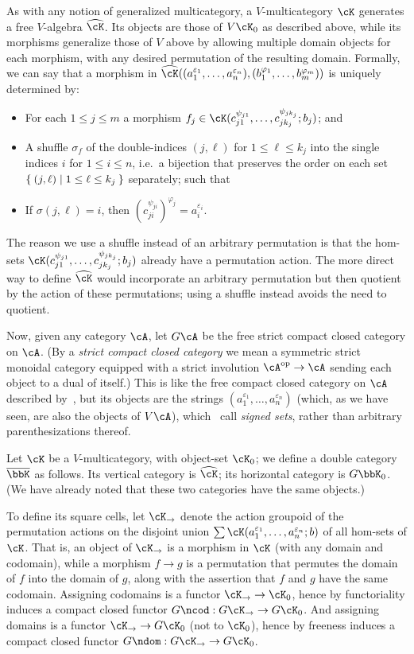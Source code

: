 \documentclass{amsart}
\newcommand{\A}{\cA}
\renewcommand{\Khat}{\ensuremath{\widehat{\cK}}\xspace}
\renewcommand{\Kbar}{\ensuremath{\overline{\bbK}}\xspace}
\newcommand{\K}{\bbK}
\newcommand{\e}[1][]{^{\varepsilon_{#1}}}
\renewcommand{\ph}[1][]{^{\varphi_{#1}}}
\newcommand{\ps}[1][]{^{\psi_{#1}}}
\begin{document}
As with any notion of generalized multicategory, a $V$-multicategory $\cK$ generates a free $V$-algebra $\Khat$.
Its objects are those of $V\cK_0$ as described above, while its morphisms generalize those of $V$ above by allowing multiple domain objects for each morphism, with any desired permutation of the resulting domain.
Formally, we can say that a morphism in $\Khat((a_1\e[1],\dots,a_n\e[n]),(b_1\ph[1],\dots,b_m\ph[m]))$ is uniquely determined by:
\begin{itemize}
\item For each $1\le j\le m$ a morphism $f_j\in \cK(c_{j1}\ps[j1],\dots,c_{j k_j}\ps[j k_j];b_j)$; and
\item A shuffle $\sigma_f$ of the double-indices $(j,\ell)$ for $1\le \ell\le k_j$ into the single indices $i$ for $1\le i\le n$, i.e.\ a bijection that preserves the order on each set $\Set{ (j,\ell) | 1\le \ell\le k_j}$ separately; such that
\item If $\sigma(j,\ell)=i$, then $(c_{ji}\ps[ji])\ph[j]=a_i\e[i]$.
\end{itemize}
The reason we use a shuffle instead of an arbitrary permutation is that the hom-sets $\cK(c_{j1}\ps[j1],\dots,c_{j k_j}\ps[j k_j];b_j)$ already have a permutation action.
The more direct way to define $\Khat$ would incorporate an arbitrary permutation but then quotient by the action of these permutations; using a shuffle instead avoids the need to quotient.

Now, given any category $\A$, let $G\A$ be the free strict compact closed category on $\A$.
(By a \emph{strict compact closed category} we mean a symmetric strict monoidal category equipped with a strict involution $\A\op\to\A$ sending each object to a dual of itself.)
This is like the free compact closed category on $\A$ described by~\cite{kelly-laplaza}, but its objects are the strings $(a_1\e[1],\dots,a_n\e[n])$ (which, as we have seen, are also the objects of $V\A$), which~\cite{kelly-laplaza} call \emph{signed sets}, rather than arbitrary parenthesizations thereof.

Let $\cK$ be a $V$-multicategory, with object-set $\cK_0$; we define a double category $\Kbar$ as follows.
Its vertical category is $\Khat$; its horizontal category is $G\K_0$.
(We have already noted that these two categories have the same objects.)

To define its square cells, let $\cK_\to$ denote the action groupoid of the permutation actions on the disjoint union $\sum \cK(a_1\e[1],\dots,a_n\e[n];b)$ of all hom-sets of $\cK$.
That is, an object of $\cK_\to$ is a morphism in $\cK$ (with any domain and codomain), while a morphism $f\to g$ is a permutation that permutes the domain of $f$ into the domain of $g$, along with the assertion that $f$ and $g$ have the same codomain.
Assigning codomains is a functor $\cK_\to\to\cK_0$, hence by functoriality induces a compact closed functor $G\ncod : G\cK_\to\to G\cK_0$.
And assigning domains is a functor $\cK_\to \to G\cK_0$ (not to $\cK_0$), hence by freeness induces a compact closed functor $G\ndom : G\cK_\to \to G\cK_0$.
\end{document}
